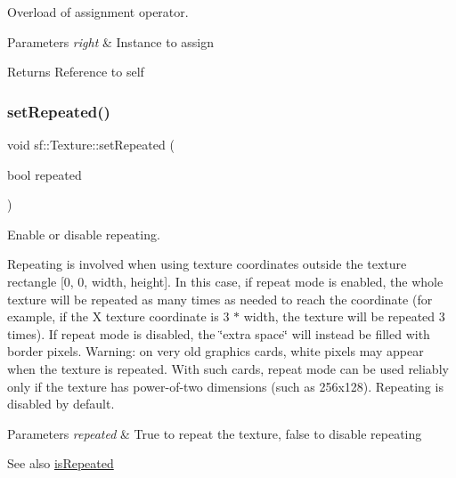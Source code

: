 Overload of assignment operator. 


\begin{DoxyParams}{Parameters}
{\em right} & Instance to assign\\
\hline
\end{DoxyParams}
\begin{DoxyReturn}{Returns}
Reference to self 
\end{DoxyReturn}
\mbox{\label{classsf_1_1_texture_aaa87d1eff053b9d4d34a24c784a28658}} 
\subsubsection{\texorpdfstring{set\+Repeated()}{setRepeated()}}
{\footnotesize\ttfamily void sf\+::\+Texture\+::set\+Repeated (\begin{DoxyParamCaption}\item[{bool}]{repeated }\end{DoxyParamCaption})}



Enable or disable repeating. 

Repeating is involved when using texture coordinates outside the texture rectangle \mbox{[}0, 0, width, height\mbox{]}. In this case, if repeat mode is enabled, the whole texture will be repeated as many times as needed to reach the coordinate (for example, if the X texture coordinate is 3 $\ast$ width, the texture will be repeated 3 times). If repeat mode is disabled, the \char`\"{}extra space\char`\"{} will instead be filled with border pixels. Warning\+: on very old graphics cards, white pixels may appear when the texture is repeated. With such cards, repeat mode can be used reliably only if the texture has power-\/of-\/two dimensions (such as 256x128). Repeating is disabled by default.


\begin{DoxyParams}{Parameters}
{\em repeated} & True to repeat the texture, false to disable repeating\\
\hline
\end{DoxyParams}
\begin{DoxySeeAlso}{See also}
\hyperlink{classsf_1_1_texture_af1a1a32ca5c799204b2bea4040df7647}{is\+Repeated} 
\end{DoxySeeAlso}
\mbox{\label{classsf_1_1_texture_a0c3bd6825b9a99714f10d44179d74324}} 
